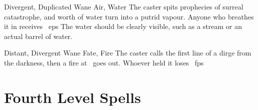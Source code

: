 \begin{multicols}{2}
  {Divergent, Duplicated}%
  {Wane}%
  {Air, Water}%
  {}%
  {The caster spits prophecies of surreal catastrophe, and  worth of water turn into a putrid vapour.
  Anyone who breathes it in receives ~\glspl{ep}}%
  {
    The water should be clearly visible, such as a stream or an actual barrel of water.}

  {Distant, Divergent}%
  {Wane}%
  {Fate, Fire}%
  {}%
  {The caster calls the first line of a dirge from the darkness, then a fire at \spellRange\ goes out.
  Whoever held it loses \showDam~\glspl{fp}}%
  {}


\end{multicols}

\filbreak
\section{Fourth Level Spells}

